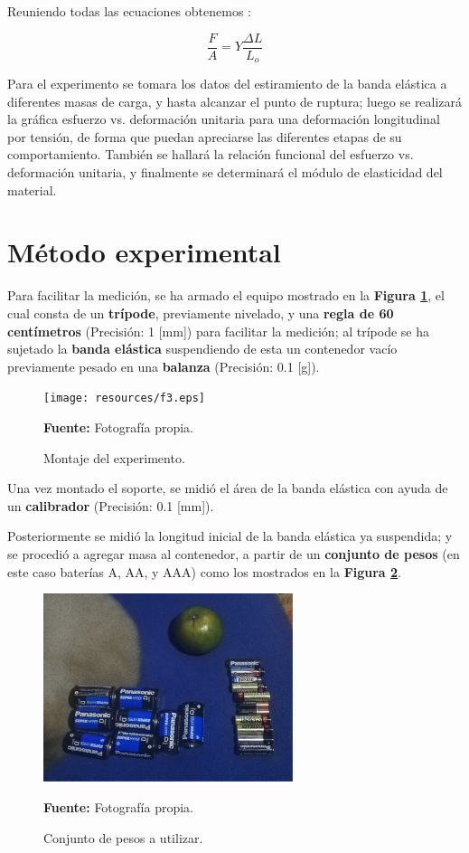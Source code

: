 \documentclass[letter,11pt]{article}
\newcommand{\source}[1]{\vspace{-11pt} \caption*{\small{\textbf{Fuente:} {#1}}}}
\begin{document}
Reuniendo todas las ecuaciones obtenemos \cite{FIS102}:

\begin{equation}
    \frac{F}{A} = Y \frac{\Delta L}{L_o}
\label{young2}
\end{equation}
\vspace{0.25cm}

Para el experimento se tomara los datos del estiramiento de la banda elástica a
diferentes masas de carga, y hasta alcanzar el punto de ruptura; luego se
realizará la gráfica esfuerzo vs. deformación unitaria para una deformación
longitudinal por tensión, de forma que puedan apreciarse las diferentes etapas
de su comportamiento. También se hallará la relación funcional del esfuerzo vs.
deformación unitaria, y finalmente se determinará el módulo de elasticidad del
material.

\section{Método experimental}

Para facilitar la medición, se ha armado el equipo mostrado en la
\textbf{Figura \ref{figura3}}, el cual consta de un \textbf{trípode},
previamente nivelado, y una \textbf{regla de 60 centímetros} (Precisión: 1 [mm])
para facilitar la medición; al trípode se ha sujetado la \textbf{banda elástica}
suspendiendo de esta un contenedor vacío previamente pesado en una
\textbf{balanza} (Precisión: 0.1 [g]).

\begin{figure}
\centering
\texttt{[image: resources/f3.eps]}
\caption{Montaje del experimento.}
\label{figura3}
\source{Fotografía propia.}
\end{figure}

Una vez montado el soporte, se midió el área de la banda elástica con ayuda de
un \textbf{calibrador} (Precisión: 0.1 [mm]).

Posteriormente se midió la longitud inicial de la banda elástica ya suspendida;
y se procedió a agregar masa al contenedor, a partir de un
\textbf{conjunto de pesos} (en este caso baterías A, AA, y AAA) como los
mostrados en la \textbf{Figura \ref{figura2}}.

\begin{figure}
\centering
\includegraphics[width=0.65\textwidth]{resources/f2.eps}
\caption{Conjunto de pesos a utilizar.}
\label{figura2}
\source{Fotografía propia.}
\end{figure}
\end{document}
